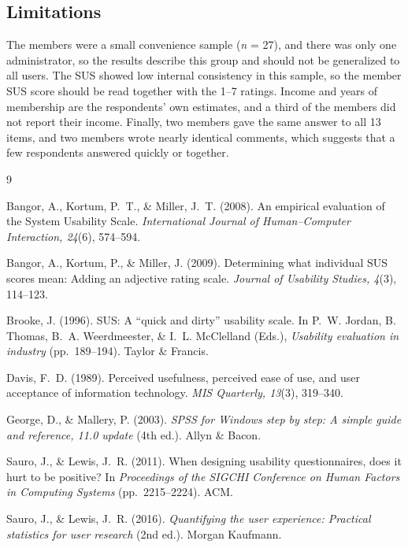 \documentclass[11pt,a4paper]{article}
\begin{document}
\subsection{Limitations}
The members were a small convenience sample (\textit{n} = 27), and there was only one administrator, so the results describe this group and should not be generalized to all users. The SUS showed low internal consistency in this sample, so the member SUS score should be read together with the 1--7 ratings. Income and years of membership are the respondents' own estimates, and a third of the members did not report their income. Finally, two members gave the same answer to all 13 items, and two members wrote nearly identical comments, which suggests that a few respondents answered quickly or together.

\begin{thebibliography}{9}
\setlength{\itemsep}{2pt}
\small

Bangor, A., Kortum, P.~T., \& Miller, J.~T. (2008). An empirical evaluation of the System Usability Scale. \textit{International Journal of Human--Computer Interaction, 24}(6), 574--594.

Bangor, A., Kortum, P., \& Miller, J. (2009). Determining what individual SUS scores mean: Adding an adjective rating scale. \textit{Journal of Usability Studies, 4}(3), 114--123.

Brooke, J. (1996). SUS: A ``quick and dirty'' usability scale. In P.~W. Jordan, B. Thomas, B.~A. Weerdmeester, \& I.~L. McClelland (Eds.), \textit{Usability evaluation in industry} (pp.~189--194). Taylor \& Francis.

Davis, F.~D. (1989). Perceived usefulness, perceived ease of use, and user acceptance of information technology. \textit{MIS Quarterly, 13}(3), 319--340.

George, D., \& Mallery, P. (2003). \textit{SPSS for Windows step by step: A simple guide and reference, 11.0 update} (4th ed.). Allyn \& Bacon.

Sauro, J., \& Lewis, J.~R. (2011). When designing usability questionnaires, does it hurt to be positive? In \textit{Proceedings of the SIGCHI Conference on Human Factors in Computing Systems} (pp.~2215--2224). ACM.

Sauro, J., \& Lewis, J.~R. (2016). \textit{Quantifying the user experience: Practical statistics for user research} (2nd ed.). Morgan Kaufmann.

\end{thebibliography}
\end{document}
